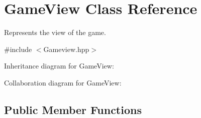 \hypertarget{class_game_view}{}\section{Game\+View Class Reference}
\label{class_game_view}


Represents the view of the game.  




{\ttfamily \#include $<$Gameview.\+hpp$>$}



Inheritance diagram for Game\+View\+:


Collaboration diagram for Game\+View\+:
\subsection*{Public Member Functions}
